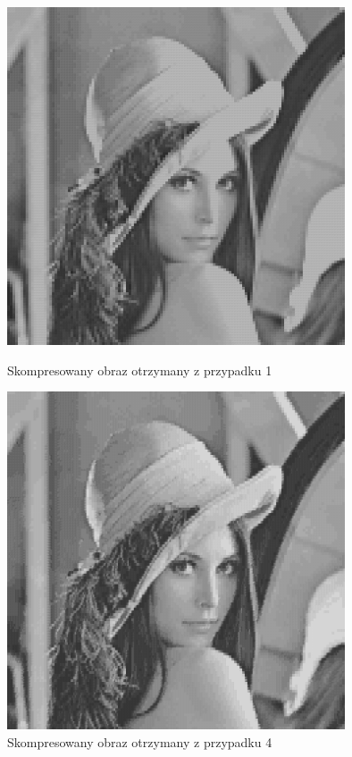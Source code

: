 \documentclass[12pt]{article}
\begin{document}
\begin{figure}[h!]
 \centering
 
 \includegraphics[width=10cm]{CB_neurons=40_block_size=4x4_50.png}
 \vspace{-0.3cm}
 \caption{Skompresowany obraz otrzymany z przypadku 1}
 \vspace*{\floatsep}

 \includegraphics[width=10cm]{CB_neurons=40_block_size=4x4_50000.png}
 \vspace{-0.3cm}
 \caption{Skompresowany obraz otrzymany z przypadku 4}

\end{figure}
\clearpage

\end{document}
